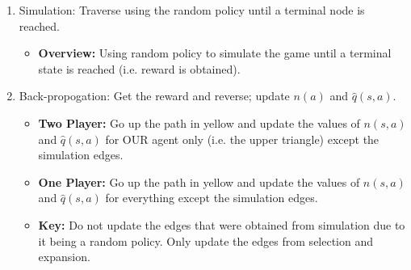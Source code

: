 \begin{algo}
    \begin{enumerate}
        \item Simulation: Traverse using the random policy until a terminal node is reached. 
        \begin{itemize}
            \item \textbf{Overview:} Using random policy to simulate the game until a terminal state is reached (i.e. reward is obtained).
        \end{itemize}
        \item Back-propogation: Get the reward and reverse; update $n(a)$ and $\hat{q}(s,a)$.
        \begin{itemize}
            \item \textbf{Two Player:} Go up the path in yellow and update the values of $n(s,a)$ and $\hat{q}(s,a)$ for OUR agent only (i.e. the upper triangle) except the simulation edges.
            \item \textbf{One Player:} Go up the path in yellow and update the values of $n(s,a)$ and $\hat{q}(s,a)$ for everything except the simulation edges.
            \item \textbf{Key:} Do not update the edges that were obtained from simulation due to it being a random policy. Only update the edges from selection and expansion.
        \end{itemize}
    \end{enumerate}
\end{algo}


